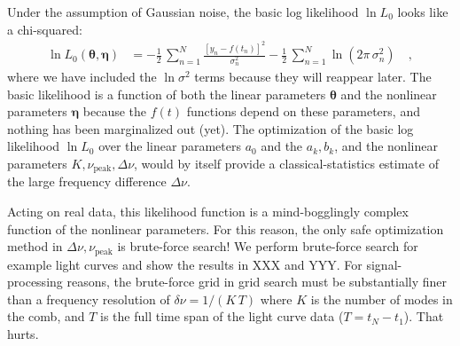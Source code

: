 \documentclass[modern]{aastex63}
\newcommand{\nupeak}{\nu_\mathrm{peak}}
\renewcommand{\vector}[1]{\boldsymbol{#1}}
\newcommand{\veta}{\vector{\eta}}
\newcommand{\vtheta}{\vector{\theta}}
\begin{document}
Under the assumption of Gaussian noise, the basic log likelihood $\ln L_0$ looks like a
chi-squared:
\begin{align}\label{eq:like}
  \ln L_0(\vtheta,\veta)
  &= -\frac{1}{2}\,\sum_{n=1}^N \frac{[y_n - f(t_n)]^2}{\sigma_n^2}
     -\frac{1}{2}\,\sum_{n=1}^N \ln(2\pi\,\sigma_n^2)
  \quad,
\end{align}
where we have included the $\ln\sigma^2$ terms because they will reappear later.
The basic likelihood is a function of both the linear parameters $\vtheta$ and
the nonlinear parameters $\veta$ because the $f(t)$ functions depend on these
parameters, and nothing has been marginalized out (yet).
The optimization of the basic log likelihood $\ln L_0$
over the linear parameters $a_0$ and the $a_k, b_k$, and the nonlinear
parameters $K, \nupeak, \Delta\nu$, would by itself provide a
classical-statistics estimate of the large frequency difference
$\Delta\nu$.

Acting on real data, this likelihood function is a mind-bogglingly complex
function of the nonlinear parameters.
For this reason, the only safe optimization method in $\Delta\nu, \nupeak$ is
brute-force search!
We perform brute-force search for example light curves  and show the results in XXX
and YYY.
For signal-processing reasons, the brute-force grid in grid search must be
substantially finer than a frequency resolution of $\delta\nu = 1/(K\,T)$ where
$K$ is the number of modes in the comb, and $T$ is the full time span of the
light curve data ($T = t_N - t_1$).
That hurts.
\end{document}
